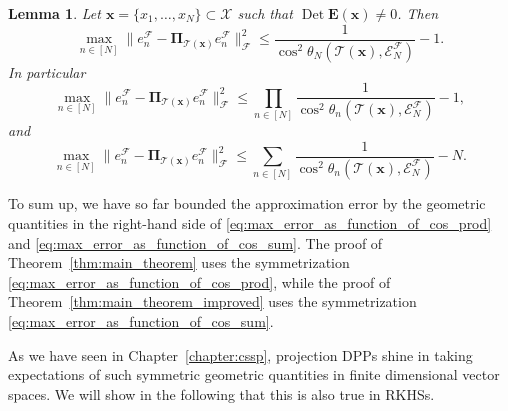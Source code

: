 \documentclass[twoside,11pt]{book}
\newtheorem{lemma}{Lemma}
\numberwithin{theorem}{chapter}
\numberwithin{definition}{chapter}
\numberwithin{proposition}{chapter}
\numberwithin{corollary}{chapter}
\numberwithin{example}{chapter}
\numberwithin{lemma}{chapter}
\numberwithin{assumption}{chapter}
\numberwithin{equation}{chapter}
\numberwithin{figure}{chapter}
\DeclareMathOperator{\Det}{Det}
\DeclareMathOperator{\F}{\mathcal{F}}
\begin{document}
\begin{lemma}\label{lemma:max_error_cos}
Let $\bm{x} = \{x_{1}, \dots , x_{N}\} \subset \mathcal{X}$ such that $\Det \bm{E}(\bm{x}) \neq 0$. Then
\begin{equation}\label{eq:max_error_as_function_of_cos}
	\max_{ n \in [N]} \|e_{n}^{\F} - \bm{\Pi}_{\mathcal{T}(\bm{x})} e_{n}^{\F}\|_{\mathcal{F}}^{2} \leq \frac{1}{\cos^{2} \theta_{N}(\mathcal{T}(\bm{x}),\mathcal{E}^{\mathcal{F}}_{N})} - 1. 
\end{equation}
In particular
\begin{equation}\label{eq:max_error_as_function_of_cos_prod}
\max_{ n \in [N]} \|e_{n}^{\F} - \bm{\Pi}_{\mathcal{T}(\bm{x})} e_{n}^{\F}\|_{\mathcal{F}}^{2} \leq \prod\limits_{n \in [N]}\frac{1}{\cos^{2} \theta_{n}(\mathcal{T}(\bm{x}),\mathcal{E}^{\mathcal{F}}_{N})} - 1,
\end{equation}
and
\begin{equation}\label{eq:max_error_as_function_of_cos_sum}
\max_{ n \in [N]} \|e_{n}^{\F} - \bm{\Pi}_{\mathcal{T}(\bm{x})} e_{n}^{\F}\|_{\mathcal{F}}^{2} \leq \sum\limits_{n \in [N]}\frac{1}{\cos^{2} \theta_{n}(\mathcal{T}(\bm{x}),\mathcal{E}^{\mathcal{F}}_{N})} - N.
\end{equation}
\end{lemma}





To sum up, we have so far bounded the approximation error by the geometric quantities in the right-hand side of \eqref{eq:max_error_as_function_of_cos_prod} and \eqref{eq:max_error_as_function_of_cos_sum}.
The proof of Theorem~\ref{thm:main_theorem} uses the symmetrization \eqref{eq:max_error_as_function_of_cos_prod}, while
the proof of Theorem~\ref{thm:main_theorem_improved} uses the symmetrization \eqref{eq:max_error_as_function_of_cos_sum}.

As we have seen in Chapter~\ref{chapter:cssp}, projection DPPs shine in taking expectations of such symmetric geometric quantities in finite dimensional vector spaces. We will show in the following that this is also true in RKHSs. 

\end{document}
